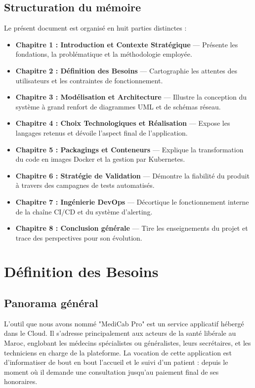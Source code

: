 \documentclass[final]{report}
\begin{document}
\section{Structuration du mémoire}
Le présent document est organisé en huit parties distinctes :
\begin{itemize}
  \item \textbf{Chapitre 1 : Introduction et Contexte Stratégique} --- Présente les fondations, la problématique et la méthodologie employée.
  \item \textbf{Chapitre 2 : Définition des Besoins} --- Cartographie les attentes des utilisateurs et les contraintes de fonctionnement.
  \item \textbf{Chapitre 3 : Modélisation et Architecture} --- Illustre la conception du système à grand renfort de diagrammes UML et de schémas réseau.
  \item \textbf{Chapitre 4 : Choix Technologiques et Réalisation} --- Expose les langages retenus et dévoile l'aspect final de l'application.
  \item \textbf{Chapitre 5 : Packagings et Conteneurs} --- Explique la transformation du code en images Docker et la gestion par Kubernetes.
  \item \textbf{Chapitre 6 : Stratégie de Validation} --- Démontre la fiabilité du produit à travers des campagnes de tests automatisés.
  \item \textbf{Chapitre 7 : Ingénierie DevOps} --- Décortique le fonctionnement interne de la chaîne CI/CD et du système d'alerting.
  \item \textbf{Chapitre 8 : Conclusion générale} --- Tire les enseignements du projet et trace des perspectives pour son évolution.
\end{itemize}
 

\chapter{Définition des Besoins}
 
\section{Panorama général}
L'outil que nous avons nommé "MediCab Pro" est un service applicatif hébergé dans le Cloud. Il s'adresse principalement aux acteurs de la santé libérale au Maroc, englobant les médecins spécialistes ou généralistes, leurs secrétaires, et les techniciens en charge de la plateforme. La vocation de cette application est d'informatiser de bout en bout l'accueil et le suivi d'un patient : depuis le moment où il demande une consultation jusqu'au paiement final de ses honoraires.
 
\end{document}
